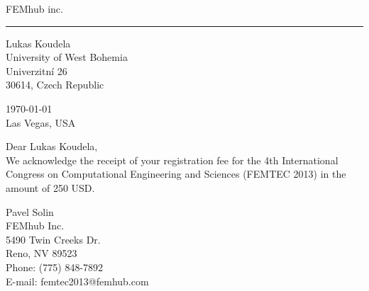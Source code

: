 
\textwidth 160mm
\textheight 290mm

\oddsidemargin 0mm
\evensidemargin 0mm
\topmargin -10mm

\itemindent 0mm
\parindent 10mm

\newcommand{\receipt}[7]
{
	\begin{center}
		\vspace{10pt}
		{\LARGE FEMhub inc.}\\
		\vspace{10pt}
		\hrule height 1pt
	\end{center}	
	\vspace{60pt}
	
	\noindent
	{#1}\\
	{#2}\\
	{#3}\\
	{#4}\quad {#5}, {#6}\\
	\vspace{60pt}
	
	\begin{flushright}
		\today\\
		Las Vegas, USA
	\end{flushright}
	\vspace{30pt}
	
	\noindent Dear {#1},\\
	
	We acknowledge the receipt of your registration fee for the 4th International Congress on Computational Engineering and Sciences (FEMTEC 2013) in the amount of {#7}.
	\vspace{90pt}

	\noindent
	Pavel Solin\\
	FEMhub Inc.\\
	5490 Twin Creeks Dr.\\
	Reno, NV 89523\\
	Phone: (775) 848-7892\\
	E-mail: femtec2013@femhub.com\\
	\newpage
}


\pagestyle{empty}
\receipt{Lukas Koudela}{University of West Bohemia}{Univerzitní 26}{30614}{Pilsen}{Czech Republic}{250 USD}




